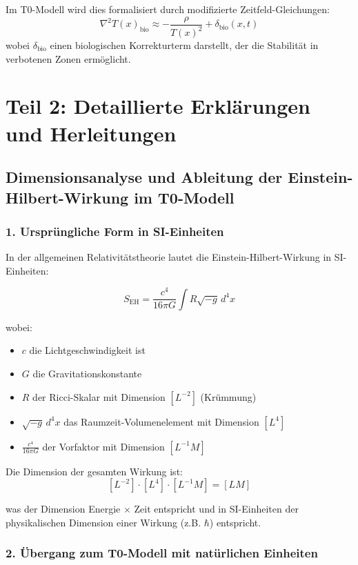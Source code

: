 \documentclass[12pt,a4paper]{article}
\newcommand{\Tfield}{T(x)}
\begin{document}
	Im T0-Modell wird dies formalisiert durch modifizierte Zeitfeld-Gleichungen:
	\[
	\nabla^2 \Tfield_{\mathrm{bio}} \approx -\frac{\rho}{\Tfield^2} + \delta_{\mathrm{bio}}(x,t)
	\]
	wobei \(\delta_{\mathrm{bio}}\) einen biologischen Korrekturterm darstellt, der die Stabilität in verbotenen Zonen ermöglicht.
	
	\section*{Teil 2: Detaillierte Erklärungen und Herleitungen}
	
	\subsection*{Dimensionsanalyse und Ableitung der Einstein-Hilbert-Wirkung im T0-Modell}
	
	\subsubsection*{1. Ursprüngliche Form in SI-Einheiten}
	
	In der allgemeinen Relativitätstheorie lautet die Einstein-Hilbert-Wirkung in SI-Einheiten:
	
	\[
	S_{\mathrm{EH}} = \frac{c^4}{16\pi G} \int R \sqrt{-g} \, d^4x
	\]
	
	wobei:
	\begin{itemize}
		\item $c$ die Lichtgeschwindigkeit ist
		\item $G$ die Gravitationskonstante
		\item $R$ der Ricci-Skalar mit Dimension $[L^{-2}]$ (Krümmung)
		\item $\sqrt{-g} \, d^4x$ das Raumzeit-Volumenelement mit Dimension $[L^4]$
		\item $\frac{c^4}{16\pi G}$ der Vorfaktor mit Dimension $[L^{-1} M]$
	\end{itemize}
	
	Die Dimension der gesamten Wirkung ist:
	\[
	[L^{-2}] \cdot [L^4] \cdot [L^{-1} M] = [L M]
	\]
	
	was der Dimension Energie $\times$ Zeit entspricht und in SI-Einheiten der physikalischen Dimension einer Wirkung (z.B. $\hbar$) entspricht.
	
	
	\subsubsection*{2. Übergang zum T0-Modell mit natürlichen Einheiten}
	
\end{document}
